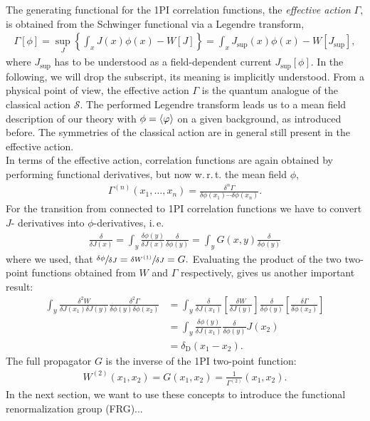 The generating functional for the  1PI correlation functions, the \textit{effective action} $\Gamma$, is obtained from the Schwinger functional via a Legendre transform, 
\begin{align}
	\Gamma[\phi]=\sup _{J}\left\{\int_{x} J(x) \phi(x)-W[J]\right\}=\int_{x} J_{\mathrm{sup}}(x) \phi(x)-W\left[J_{\mathrm{sup}}\right],
\end{align}
where $J_{\mathrm{sup}}$ has to be understood as a field-dependent current $J_{\mathrm{sup}}[\phi]$. In the following, we will drop the subscript, its meaning is implicitly understood.  From a physical point of view, the effective action $\Gamma$ is the quantum analogue of the classical action $\mathcal{S}$. The performed Legendre transform leads us to a mean field description of our theory with $\phi = \langle \varphi \rangle$ on a given background, as introduced before. The symmetries of the classical action are in general still present in the effective action.\\
In terms of the effective action, correlation functions are again obtained by performing functional derivatives, but now w.\,r.\,t. the mean field $\phi$,
\begin{align}
	\Gamma^{(n)}\left(x_{1}, \ldots, x_{n}\right)=\frac{\delta^{n} \Gamma}{\delta \phi\left(x_{1}\right) \cdots \delta \phi\left(x_{n}\right)}.
\end{align}
For the transition from connected to 1PI correlation functions we have to convert $J$- derivatives into $\phi$-derivatives, i.\,e.
\begin{align}
	\frac{\delta}{\delta J(x)}=\int_{y} \frac{\delta \phi(y)}{\delta J(x)} \frac{\delta}{\delta \phi(y)}=\int_{y} G(x, y) \frac{\delta}{\delta\phi(y)}
\end{align}
where we used, that $\sfrac{\delta\phi}{\delta J} = \sfrac{\delta W^{(1)}}{\delta J} = G.$ Evaluating the product of the two two-point functions obtained from $W$ and $\Gamma$ respectively, gives us another important result:
\begin{align}
 \int_{y} \frac{\delta^{2} W}{\delta J\left(x_{1}\right) \delta J(y)} \frac{\delta^{2} \Gamma}{\delta \phi(y) \delta\phi\left(x_{2}\right)} &=\int_{y} \frac{\delta}{\delta J\left(x_{1}\right)}\left[\frac{\delta W}{\delta J(y)}\right] \frac{\delta}{\delta \phi(y)}\left[\frac{\delta \Gamma}{\delta \phi\left(x_{2}\right)}\right] \nonumber\\[10pt]
	&=\int_{y} \frac{\delta \phi(y)}{\delta J\left(x_{1}\right)} \frac{\delta}{\delta \phi(y)} J\left(x_{2}\right) \\[10pt] 
	&=\delta_{\mathrm{D}}\left(x_{1}-x_{2}\right).\nonumber
\end{align} 
The full propagator $G$ is the inverse of the 1PI two-point function:
\begin{align}
	W^{(2)}(x_1,x_2) = G(x_1,x_2) = \frac{1}{\Gamma^{(2)}}(x_1,x_2).
\end{align}
 In the next section, we want to use these concepts to introduce the functional renormalization group (FRG)... 
